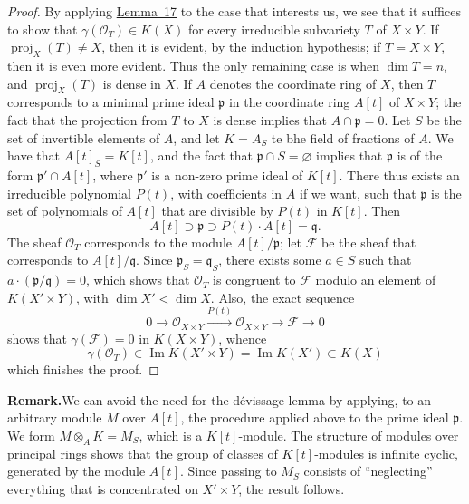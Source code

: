 \documentclass{article}
\newenvironment{rmenv}[1]
  {\phantomsection\par\medskip\noindent\textbf{#1.}\rmfamily}
  {\par\medskip}
\newcommand{\scr}[1]{{\mathscr{#1}}}
\DeclareMathOperator{\proj}{proj}
\newcommand{\oldpage}[1]{\marginpar{\footnotesize$\Big\vert$ \textit{p.~#1}}}
\begin{document}
\begin{proof}
  By applying \hyperref[lemma17]{Lemma~17} to the case that interests us, we see that it suffices to show that $\gamma(\scr{O}_T)\in K(X)$ for every irreducible subvariety $T$ of $X\times Y$.
  If $\proj_X(T)\neq X$, then it is evident, by the induction hypothesis;
  if $T=X\times Y$, then it is even more evident.
  Thus the only remaining case is when $\dim T=n$, and $\proj_X(T)$ is dense in $X$.
  If $A$ denotes the coordinate ring of $X$, then $T$ corresponds to a minimal prime ideal $\mathfrak{p}$ in the coordinate ring $A[t]$ of $X\times Y$;
  the fact that the projection from $T$ to $X$ is dense implies that $A\cap\mathfrak{p}=0$.
  Let $S$ be the set of invertible elements of $A$, and let $K=A_S$ te bhe field of fractions of $A$.
  We have that $A[t]_S=K[t]$, and the fact that $\mathfrak{p}\cap S=\varnothing$ implies that $\mathfrak{p}$ is of the form $\mathfrak{p}'\cap A[t]$, where $\mathfrak{p}'$ is a non-zero prime ideal of $K[t]$.
  There thus exists an irreducible polynomial $P(t)$, with coefficients in $A$ if we want, such that $\mathfrak{p}$ is the set of polynomials of $A[t]$ that are divisible by $P(t)$ in $K[t]$.
  Then
  \[
    A[t] \supset \mathfrak{p} \supset P(t)\cdot A[t] = \mathfrak{q}.
  \]
  The sheaf $\scr{O}_T$ corresponds to the module $A[t]/\mathfrak{p}$;
  let $\scr{F}$ be the sheaf that corresponds to $A[t]/\mathfrak{q}$.
  Since $\mathfrak{p}_S=\mathfrak{q}_S$, there exists some $a\in S$ such that $a\cdot(\mathfrak{p}/\mathfrak{q})=0$, which shows that $\scr{O}_T$ is congruent to $\scr{F}$ modulo an element of $K(X'\times Y)$, with $\dim X'<\dim X$.
  Also, the exact sequence
  \[
    0 \to \scr{O}_{X\times Y} \xrightarrow{P(t)} \scr{O}_{X\times Y} \to \scr{F} \to 0
  \]
  shows that $\gamma(\scr{F})=0$ in $K(X\times Y)$, whence
  \[
    \gamma(\scr{O}_T) \in \operatorname{Im} K(X'\times Y) = \operatorname{Im} K(X') \subset K(X)
  \]
  which finishes the proof.
\end{proof}

\oldpage{118}
\begin{rmenv}{Remark}[Cartier]
  We can avoid the need for the d\'{e}vissage lemma by applying, to an arbitrary module $M$ over $A[t]$, the procedure applied above to the prime ideal $\mathfrak{p}$.
  We form $M\otimes_A K=M_S$, which is a $K[t]$-module.
  The structure of modules over principal rings shows that the group of classes of $K[t]$-modules is infinite cyclic, generated by the module $A[t]$.
  Since passing to $M_S$ consists of ``neglecting'' everything that is concentrated on $X'\times Y$, the result follows.
\end{rmenv}
\end{document}
